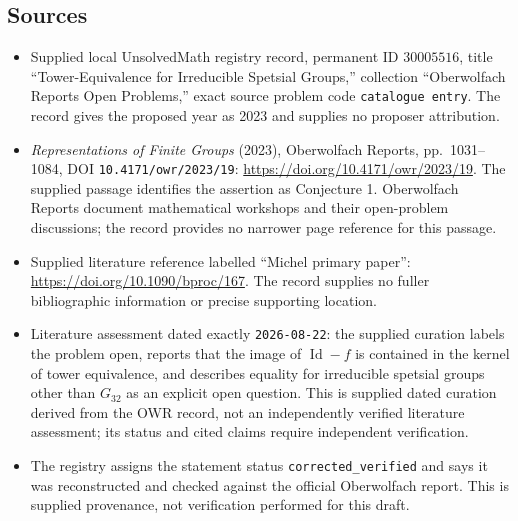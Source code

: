\documentclass[11pt]{article}
\begin{document}
\subsection{Sources}
\begin{itemize}
\item Supplied local UnsolvedMath registry record, permanent ID \(30005516\), title ``Tower-Equivalence for Irreducible Spetsial Groups,'' collection ``Oberwolfach Reports Open Problems,'' exact source problem code \texttt{catalogue entry}. The record gives the proposed year as 2023 and supplies no proposer attribution.
\item \emph{Representations of Finite Groups} (2023), Oberwolfach Reports, pp.\ 1031--1084, DOI \texttt{10.4171/owr/2023/19}: \url{https://doi.org/10.4171/owr/2023/19}. The supplied passage identifies the assertion as Conjecture 1. Oberwolfach Reports document mathematical workshops and their open-problem discussions; the record provides no narrower page reference for this passage.
\item Supplied literature reference labelled ``Michel primary paper'': \url{https://doi.org/10.1090/bproc/167}. The record supplies no fuller bibliographic information or precise supporting location.
\item Literature assessment dated exactly \texttt{2026-08-22}: the supplied curation labels the problem open, reports that the image of \(\operatorname{Id}-f\) is contained in the kernel of tower equivalence, and describes equality for irreducible spetsial groups other than \(G_{32}\) as an explicit open question. This is supplied dated curation derived from the OWR record, not an independently verified literature assessment; its status and cited claims require independent verification.
\item The registry assigns the statement status \texttt{corrected\_verified} and says it was reconstructed and checked against the official Oberwolfach report. This is supplied provenance, not verification performed for this draft.
\end{itemize}
\end{document}
